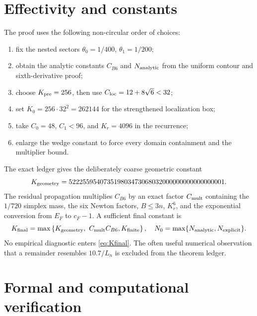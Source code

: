 \documentclass[12pt]{article}
\begin{document}
\section{Effectivity and constants}\label{sec:effectivity}

The proof uses the following non-circular order of choices:
\begin{enumerate}
\item fix the nested sectors $\theta_0=1/400$, $\theta_1=1/200$;
\item obtain the analytic constants $C_{B6}$ and $N_{\rm analytic}$ from the
uniform contour and sixth-derivative proof;
\item choose $K_{\rm pre}=256$, then use
$C_{\rm loc}=12+8\sqrt6<32$;
\item set $K_0=256\cdot32^2=262144$ for the strengthened localization box;
\item take $C_0=48$, $C_1<96$, and $K_r=4096$ in the recurrence;
\item enlarge the wedge constant to force every domain containment and the
multiplier bound.
\end{enumerate}

The exact ledger gives the deliberately coarse geometric constant
\begin{equation}\label{eq:Kgeometry}
 K_{\rm geometry}=
 522255954073519803473068032000000000000000001.
\end{equation}
The residual propagation multiplies $C_{B6}$ by an exact factor
$C_{\rm mult}$ containing the $1/720$ simplex mass, the six Newton factors,
$B\le3n$, $K_r^6$, and the exponential conversion from $E_F$ to $c_F-1$.
A sufficient final constant is
\begin{equation}\label{eq:Kfinal}
 K_{\rm final}=\max\left\{
 K_{\rm geometry},\ C_{\rm mult}C_{B6},\\
 K_{\rm finite}\right\},
\quad N_0=\max\{N_{\rm analytic},N_{\rm explicit}\}.
\end{equation}
No empirical diagnostic enters \eqref{eq:Kfinal}.  The often useful numerical
observation that a remainder resembles $10.7/L_n$ is excluded from the
theorem ledger.

\section{Formal and computational verification}\label{sec:verification}
\end{document}
